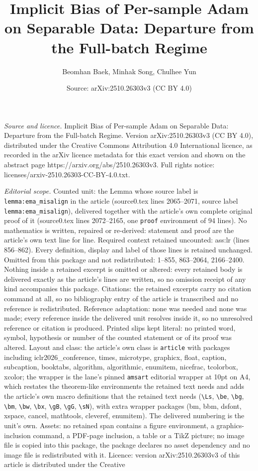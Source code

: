 \documentclass[10pt,a4paper]{amsart}
\title[Implicit Bias of Per-sample Adam on Separable Data: Departur]{Implicit Bias of Per-sample Adam on Separable Data: Departure from the Full-batch Regime}
\author{Beomhan Baek, Minhak Song, Chulhee Yun}
\date{Source: arXiv:2510.26303v3 (CC BY 4.0)}
\begin{document}
\maketitle

\noindent\emph{Source and licence.} Implicit Bias of Per-sample Adam on Separable Data: Departure from the Full-batch Regime. Version arXiv:2510.26303v3 (CC BY 4.0), distributed under the Creative Commons Attribution 4.0 International licence, as recorded in the arXiv licence metadata for this exact version and shown on the abstract page https://arxiv.org/abs/2510.26303v3. Full rights notice: licenses/arxiv-2510.26303-CC-BY-4.0.txt.\par\smallskip

\noindent\textit{Editorial scope.} Counted unit: the Lemma whose source label is \texttt{lemma:ema\_misalign} in the article (source0.tex lines 2065--2071, source label \texttt{lemma:ema\_misalign}), delivered together with the article's own complete original proof of it (source0.tex lines 2072--2165, one \texttt{proof} environment of 94 lines). No mathematics is written, repaired or re-derived: statement and proof are the article's own text line for line. Required context retained uncounted: ass:lr (lines 856--862). Every definition, display and label of those lines is retained unchanged. Omitted from this package and not redistributed: 1--855, 863--2064, 2166--2400. Nothing inside a retained excerpt is omitted or altered: every retained body is delivered exactly as the article's lines are written, so no omission receipt of any kind accompanies this package. Citations: the retained excerpts carry no citation command at all, so no bibliography entry of the article is transcribed and no reference is redistributed. Reference adaptation: none was needed and none was made; every reference inside the delivered unit resolves inside it, so no unresolved reference or citation is produced. Printed slips kept literal: no printed word, symbol, hypothesis or number of the counted statement or of its proof was altered. Layout and class: the article's own class is \texttt{article} with packages including iclr2026\_conference, times, microtype, graphicx, float, caption, subcaption, booktabs, algorithm, algorithmic, enumitem, nicefrac, tcolorbox, xcolor; the wrapper is the lane's pinned \texttt{amsart} editorial wrapper at 10pt on A4, which restates the theorem-like environments the retained text needs and adds the article's own macro definitions that the retained text needs (\texttt{\textbackslash Ls}, \texttt{\textbackslash be}, \texttt{\textbackslash bg}, \texttt{\textbackslash bm}, \texttt{\textbackslash bw}, \texttt{\textbackslash bx}, \texttt{\textbackslash gB}, \texttt{\textbackslash gG}, \texttt{\textbackslash sN}), with extra wrapper packages (bm, bbm, dsfont, xspace, cancel, mathtools, cleveref, enumitem). The delivered numbering is the unit's own. Assets: no retained span contains a figure environment, a graphics-inclusion command, a PDF-page inclusion, a table or a TikZ picture; no image file is copied into this package, the package declares no asset dependency and no image file is redistributed with it. Licence: version arXiv:2510.26303v3 of this article is distributed under the Creative 
\end{document}

